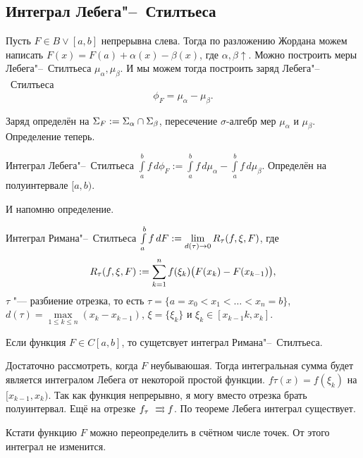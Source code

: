 \subsection{Интеграл Лебега"--~Стилтьеса}
  Пусть $F\in B\vee [a,b]$ непрерывна слева. Тогда по разложению Жордана можем написать $F(x)=F(a)+\alpha(x)-\beta(x)$, где $\alpha,\beta\uparrow$. Можно построить меры Лебега"--~Стилтьеса $\mu_\alpha,\mu_\beta$. И мы можем тогда построить заряд Лебега"--~Стилтьеса
\[
  \phi_F = \mu_\alpha-\mu_\beta.
\]

Заряд определён на $\Sigma_F:=\Sigma_\alpha\cap\Sigma_\beta$, пересечение $\sigma$-алгебр мер $\mu_\alpha$ и $\mu_\beta$. Определение теперь.

\begin{Def}
  Интеграл Лебега"--~Стилтьеса $\int\limits_a^b f\,d\phi_F:=\int\limits_a^bf\,d\mu_\alpha-\int\limits_a^bf\,d\mu_\beta$. Определён на полуинтервале $[a,b)$.
\end{Def}
 И напомню определение.
\begin{Def}
  Интеграл Римана"--~Стилтьеса $\int\limits_a^bf\,d F :=\lim\limits_{d(\tau)\rightarrow0} R_\tau(f,\xi,F)$, где 
\[R_\tau(f,\xi,F):=\sum\limits_{k = 1}^{n} f(\xi_k)\big(F(x_k)-F(x_{k-1})\big),\]
 $\tau$ "--- разбиение отрезка, то есть $\tau = \{a=x_0<x_1<\dots<x_n=b\}$, $d(\tau) = \max\limits_{1\le k\le n}(x_k-x_{k-1})$, $\xi = \{\xi_k\}$ и $\xi_k\in[x_{k-1}k,x_{k}]$.
\end{Def}

\begin{Lem}
  Если функция $F\in C[a,b]$, то сущетсвует интеграл Римана"--~Стилтьеса.
\end{Lem}
\begin{Proof}
  Достаточно рассмотреть, когда $F$ неубываюшая. Тогда интегральная сумма будет является интегралом Лебега от некоторой простой функции. $f\tau(x) = f(\xi_k)$ на $[x_{k-1},x_k)$. Так как функция непрерывно, я могу вместо отрезка брать полуинтервал. Ещё на отрезке $f_\tau\rsH[]{}f$. По теореме Лебега интеграл существует.
\end{Proof}

Кстати функцию $F$ можно переопределить в счётном числе точек. От этого интеграл не изменится.


